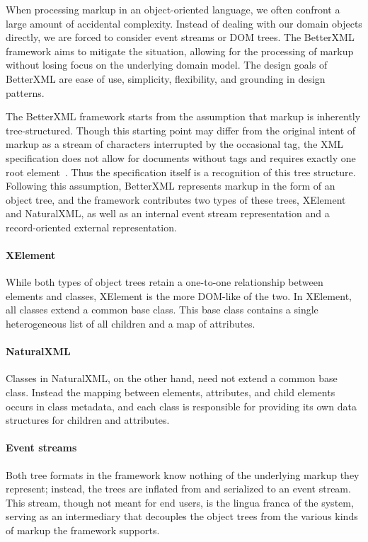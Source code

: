 When processing markup in an object-oriented language, we often
confront a large amount of accidental complexity.  Instead of dealing
with our domain objects directly, we are forced to consider event
streams or DOM trees.  The BetterXML framework aims to mitigate the
situation, allowing for the processing of markup without losing focus
on the underlying domain model. The design goals of BetterXML are ease
of use, simplicity, flexibility, and grounding in design patterns.

The BetterXML framework starts from the assumption that markup is
inherently tree-structured.  Though this starting point may differ
from the original intent of markup as a stream of characters
interrupted by the occasional tag, the XML specification does not
allow for documents without tags and requires exactly one root
element~\cite{xmlSpec}.  Thus the specification itself is a
recognition of this tree structure. Following this assumption,
BetterXML represents markup in the form of an object tree, and the
framework contributes two types of these trees, XElement and
NaturalXML, as well as an internal event stream representation and a
record-oriented external representation.

\paragraph*{XElement} While both types of object trees retain a
one-to-one relationship between elements and classes, XElement
is the more DOM-like of the two.  In XElement, all classes extend a
common base class.  This base class contains a single heterogeneous
list of all children and a map of attributes.

\paragraph*{NaturalXML} Classes in NaturalXML, on the other
hand, need not extend a common base class.  Instead the mapping
between elements, attributes, and child elements occurs in class
metadata, and each class is responsible for providing its own data
structures for children and attributes.  

\paragraph*{Event streams} Both tree formats in the framework know
nothing of the underlying markup they represent; instead, the trees
are inflated from and serialized to an event stream.  This stream,
though not meant for end users, is the lingua franca of the system,
serving as an intermediary that decouples the object trees from the
various kinds of markup the framework supports.

